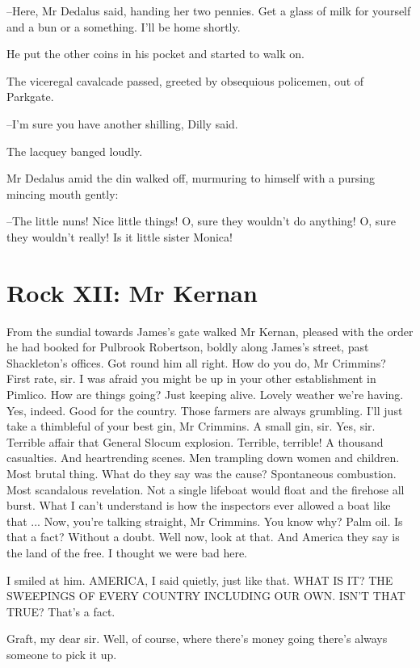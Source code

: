 --Here,
Mr Dedalus said,
handing her two pennies.
Get a glass of milk for
yourself
and a bun or a something.
I'll be home shortly.

He put the other coins in his pocket and started to walk on.

The viceregal cavalcade passed,
greeted by obsequious policemen,
out of Parkgate.%

--I'm sure you have another shilling,
Dilly said.

The lacquey banged loudly.

Mr Dedalus amid the din walked off,
murmuring to himself with a
pursing mincing mouth gently:

--The little nuns!
Nice little things!
O, sure they wouldn't do anything!
O, sure they wouldn't really!
Is it little sister Monica!


\section*{Rock XII: Mr Kernan}


From the sundial
towards James's gate
walked Mr Kernan,
pleased with the order he had booked for Pulbrook Robertson,
boldly along James's street,
past Shackleton's offices.
Got round him all right.
How do you do, Mr Crimmins?
First rate, sir.
I was afraid you might be up in your other establishment in Pimlico.
How are things going?
Just keeping alive.
Lovely weather we're having.
Yes, indeed.
Good for the country.
Those farmers are always grumbling.
I'll just take a thimbleful of your best gin, Mr Crimmins.
A small gin, sir.
Yes, sir.
Terrible affair that
General Slocum explosion.
Terrible, terrible!
A thousand casualties.
And heartrending scenes.
Men trampling down women and children.
Most brutal thing.
What do they say was the cause?
Spontaneous combustion.
Most scandalous revelation.
Not a single lifeboat would float and the firehose all burst.
What I can't understand
is how the inspectors ever allowed a boat like that ...
Now, you're talking straight, Mr Crimmins.
You know why?
Palm oil.
Is that a fact?
Without a doubt.
Well now, look at that.
And America they say is the land of the free.
I thought we were bad here.

I smiled at him.
AMERICA,
I said quietly,
just like that.
WHAT IS IT?
THE
SWEEPINGS OF EVERY COUNTRY INCLUDING OUR OWN.
ISN'T THAT TRUE?
That's a
fact.

Graft,
my dear sir.
Well, of course, where there's money going
there's
always someone to pick it up.

